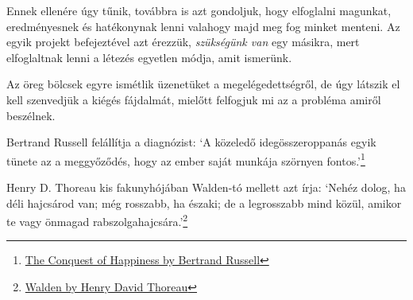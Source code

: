 Ennek ellenére úgy tűnik, továbbra is azt gondoljuk, hogy elfoglalni
magunkat, eredményesnek és hatékonynak lenni valahogy majd meg fog
minket menteni. Az egyik projekt befejeztével azt érezzük,
\emph{szükségünk van} egy másikra, mert elfoglaltnak lenni a létezés
egyetlen módja, amit ismerünk.

Az öreg bölcsek egyre ismétlik üzenetüket a megelégedettségről, de úgy
látszik el kell szenvedjük a kiégés fájdalmát, mielőtt felfogjuk mi az a
probléma amiről beszélnek.

Bertrand Russell felállítja a diagnózist: `A közeledő idegösszeroppanás
egyik tünete az a meggyőződés, hogy az ember saját munkája szörnyen
fontos.'\footnote{\href{https://www.goodreads.com/book/show/51783.The_Conquest_of_Happiness}{The
  Conquest of Happiness by Bertrand Russell}}

\enlargethispage*{\baselineskip}

Henry D. Thoreau kis fakunyhójában Walden-tó mellett azt írja: `Nehéz
dolog, ha déli hajcsárod van; még rosszabb, ha északi; de a legrosszabb
mind közül, amikor te vagy önmagad rabszolgahajcsára.'\footnote{\href{https://www.goodreads.com/book/show/16902.Walden}{Walden
  by Henry David Thoreau}}

\clearpage
\figurepagelayout

